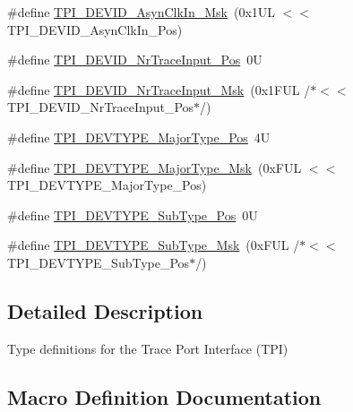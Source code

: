 \begin{DoxyCompactItemize}
\item 
\#define \hyperlink{group___c_m_s_i_s___t_p_i_gab67830557d2d10be882284275025a2d3}{T\+P\+I\+\_\+\+D\+E\+V\+I\+D\+\_\+\+Asyn\+Clk\+In\+\_\+\+Msk}~(0x1\+U\+L $<$$<$ T\+P\+I\+\_\+\+D\+E\+V\+I\+D\+\_\+\+Asyn\+Clk\+In\+\_\+\+Pos)
\item 
\#define \hyperlink{group___c_m_s_i_s___t_p_i_ga80ecae7fec479e80e583f545996868ed}{T\+P\+I\+\_\+\+D\+E\+V\+I\+D\+\_\+\+Nr\+Trace\+Input\+\_\+\+Pos}~0U
\item 
\#define \hyperlink{group___c_m_s_i_s___t_p_i_gabed454418d2140043cd65ec899abd97f}{T\+P\+I\+\_\+\+D\+E\+V\+I\+D\+\_\+\+Nr\+Trace\+Input\+\_\+\+Msk}~(0x1\+F\+U\+L /$\ast$$<$$<$ T\+P\+I\+\_\+\+D\+E\+V\+I\+D\+\_\+\+Nr\+Trace\+Input\+\_\+\+Pos$\ast$/)
\item 
\#define \hyperlink{group___c_m_s_i_s___t_p_i_ga69c4892d332755a9f64c1680497cebdd}{T\+P\+I\+\_\+\+D\+E\+V\+T\+Y\+P\+E\+\_\+\+Major\+Type\+\_\+\+Pos}~4U
\item 
\#define \hyperlink{group___c_m_s_i_s___t_p_i_gaecbceed6d08ec586403b37ad47b38c88}{T\+P\+I\+\_\+\+D\+E\+V\+T\+Y\+P\+E\+\_\+\+Major\+Type\+\_\+\+Msk}~(0x\+F\+U\+L $<$$<$ T\+P\+I\+\_\+\+D\+E\+V\+T\+Y\+P\+E\+\_\+\+Major\+Type\+\_\+\+Pos)
\item 
\#define \hyperlink{group___c_m_s_i_s___t_p_i_ga0c799ff892af5eb3162d152abc00af7a}{T\+P\+I\+\_\+\+D\+E\+V\+T\+Y\+P\+E\+\_\+\+Sub\+Type\+\_\+\+Pos}~0U
\item 
\#define \hyperlink{group___c_m_s_i_s___t_p_i_ga5b2fd7dddaf5f64855d9c0696acd65c1}{T\+P\+I\+\_\+\+D\+E\+V\+T\+Y\+P\+E\+\_\+\+Sub\+Type\+\_\+\+Msk}~(0x\+F\+U\+L /$\ast$$<$$<$ T\+P\+I\+\_\+\+D\+E\+V\+T\+Y\+P\+E\+\_\+\+Sub\+Type\+\_\+\+Pos$\ast$/)
\end{DoxyCompactItemize}


\subsection{Detailed Description}
Type definitions for the Trace Port Interface (T\+PI) 



\subsection{Macro Definition Documentation}
